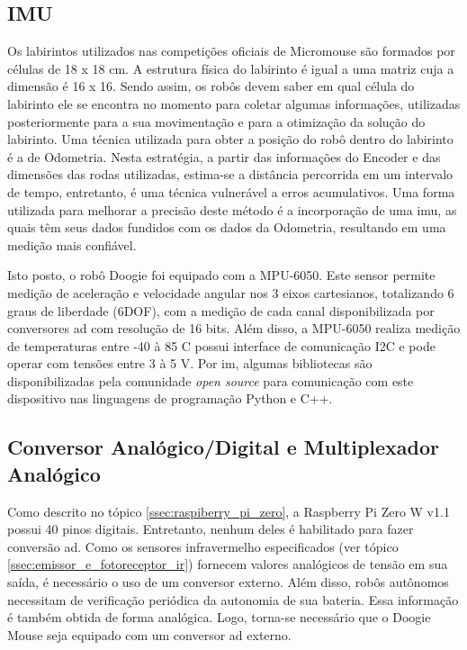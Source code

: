 \subsection{IMU}
\label{ssec:imu}
Os labirintos utilizados nas competições oficiais de Micromouse são formados por células de 18 x 18 cm. A estrutura física do labirinto é igual a uma matriz cuja a dimensão é 16 x 16. Sendo assim, os robôs devem saber em qual célula do labirinto ele se encontra no momento para coletar algumas informações, utilizadas posteriormente para a sua movimentação e para a otimização da solução do labirinto. Uma técnica utilizada para obter a posição do robô dentro do labirinto é a de Odometria. Nesta estratégia, a partir das informações do Encoder e das dimensões das rodas utilizadas, estima-se a distância percorrida em um intervalo de tempo, entretanto, é uma técnica vulnerável a erros acumulativos. Uma forma utilizada para melhorar a precisão deste método é a incorporação de uma \gls*{imu}, as quais têm seus dados fundidos com os dados da Odometria, resultando em uma medição mais confiável.

Isto posto, o robô Doogie foi equipado com a MPU-6050. Este sensor permite medição de aceleração e velocidade angular nos 3 eixos cartesianos, totalizando 6 graus de liberdade (6DOF), com a medição de cada canal disponibilizada por conversores \gls*{ad} com resolução de 16 bits. Além disso, a MPU-6050 realiza medição de temperaturas entre -40 à 85 \textdegree C possui interface de comunicação I2C e pode operar com tensões entre 3 à 5 V. Por im, algumas bibliotecas são disponibilizadas pela comunidade \textit{open source} para comunicação com este dispositivo nas linguagens de programação Python e C++.

\subsection{Conversor Analógico/Digital e Multiplexador Analógico}
\label{conversor_multiplexador_analogico}
Como descrito no tópico \ref{ssec:raspiberry_pi_zero}, a Raspberry Pi Zero W v1.1 possui 40 pinos digitais. Entretanto, nenhum deles é habilitado para fazer conversão \gls*{ad}. Como os sensores infravermelho especificados (ver tópico \ref{ssec:emissor_e_fotoreceptor_ir}) fornecem valores analógicos de tensão em sua saída, é necessário o uso de um conversor externo. Além disso, robôs autônomos necessitam de verificação periódica da autonomia de sua bateria. Essa informação é também obtida de forma analógica. Logo, torna-se necessário que o Doogie Mouse seja equipado com um conversor \gls*{ad} externo.

